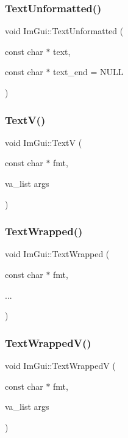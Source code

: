 \subsubsection{\texorpdfstring{Text\+Unformatted()}{TextUnformatted()}}
{\footnotesize\ttfamily void Im\+Gui\+::\+Text\+Unformatted (\begin{DoxyParamCaption}\item[{const char $\ast$}]{text,  }\item[{const char $\ast$}]{text\+\_\+end = {\ttfamily NULL} }\end{DoxyParamCaption})}

\hypertarget{namespace_im_gui_a10a0d6362178c2f743092f21e1b6cd20}{}\label{namespace_im_gui_a10a0d6362178c2f743092f21e1b6cd20} 
\subsubsection{\texorpdfstring{Text\+V()}{TextV()}}
{\footnotesize\ttfamily void Im\+Gui\+::\+TextV (\begin{DoxyParamCaption}\item[{const char $\ast$}]{fmt,  }\item[{va\+\_\+list}]{args }\end{DoxyParamCaption})}

\hypertarget{namespace_im_gui_ad57bb15c599e73b2ccc7c0f7de6e5823}{}\label{namespace_im_gui_ad57bb15c599e73b2ccc7c0f7de6e5823} 
\subsubsection{\texorpdfstring{Text\+Wrapped()}{TextWrapped()}}
{\footnotesize\ttfamily void Im\+Gui\+::\+Text\+Wrapped (\begin{DoxyParamCaption}\item[{const char $\ast$}]{fmt,  }\item[{}]{... }\end{DoxyParamCaption})}

\hypertarget{namespace_im_gui_a9019a388cd0c410bcb3d3ae63a008123}{}\label{namespace_im_gui_a9019a388cd0c410bcb3d3ae63a008123} 
\subsubsection{\texorpdfstring{Text\+Wrapped\+V()}{TextWrappedV()}}
{\footnotesize\ttfamily void Im\+Gui\+::\+Text\+WrappedV (\begin{DoxyParamCaption}\item[{const char $\ast$}]{fmt,  }\item[{va\+\_\+list}]{args }\end{DoxyParamCaption})}

